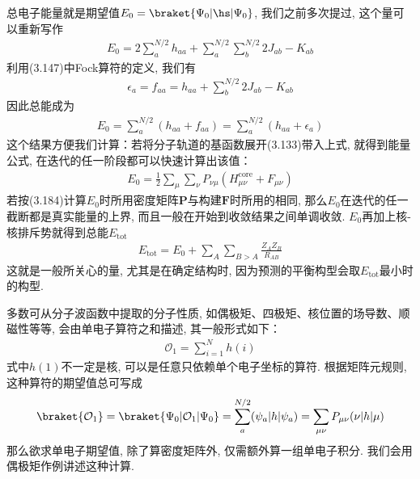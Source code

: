 总电子能量就是期望值$E_0 = \braket{\Psi_0|\hs|\Psi_0}$, 
我们之前多次提过, 
这个量可以重新写作
\begin{align}
	E_0 =2\sum_a^{N/2}h_{aa} + \sum_a^{N/2}\sum_b^{N/2}2J_{ab}-K_{ab}
\end{align}
利用(3.147)中Fock算符的定义, 
我们有
\begin{align}
	\epsilon_a = f_{aa} = h_{aa} + \sum_b^{N/2}2J_{ab} - K_{ab}
\end{align}
因此总能成为
\begin{align}
	E_0 = \sum_{a}^{N/2}(h_{aa}+f_{aa}) = \sum_{a}^{N/2}(h_{aa}+\epsilon_a)
\end{align}
这个结果方便我们计算：若将分子轨道的基函数展开(3.133)带入上式, 
就得到能量公式, 
在迭代的任一阶段都可以快速计算出该值：
\begin{align}
	\label{3.184}
	E_0 = \frac{1}{2}\sum_\mu\sum_\nu P_{\nu\mu}(H_{\mu\nu}^\mathrm{core}+F_{\mu\nu})
\end{align}
若按(3.184)计算$E_0$时所用密度矩阵$\mathbf{P}$与构建$\mathbf{F}$时所用的相同, 
那么$E_0$在迭代的任一截断都是真实能量的上界, 
而且一般在开始到收敛结果之间单调收敛. 
$E_0$再加上核-核排斥势就得到总能$E_\mathrm{tot}$
\begin{align}
	\label{3.185}
	E_\mathrm{tot} = E_0 + \sum_{A}\sum_{B>A}\frac{Z_AZ_B}{R_{AB}}
\end{align}
这就是一般所关心的量, 
尤其是在确定结构时, 
因为预测的平衡构型会取$E_\mathrm{tot}$最小时的构型.


多数可从分子波函数中提取的分子性质, 
如偶极矩、四极矩、核位置的场导数、顺磁性等等, 
会由单电子算符之和描述, 
其一般形式如下：
\begin{align}
	\mathcal{O}_1 = \sum_{i=1}^{N}h(i)
\end{align}
式中$h(1)$不一定是核\ha, 
可以是任意只依赖单个电子坐标的算符. 
根据矩阵元规则, 
这种算符的期望值总可写成
\begin{align}
	\braket{\mathcal{O}_1} = \braket{\Psi_0|\mathcal{O}_1|\Psi_0} = \sum_{a}^{N/2}(\psi_a|h|\psi_a) = \sum_{\mu\nu}P_{\mu\nu}(\nu|h|\mu)
\end{align}
那么欲求单电子期望值, 
除了算密度矩阵外, 
仅需额外算一组单电子积分. 
我们会用偶极矩作例讲述这种计算. 


